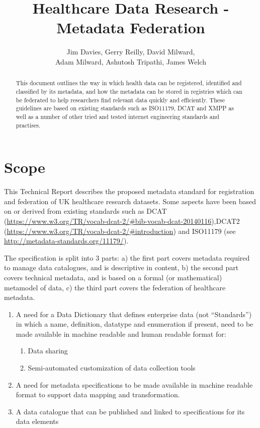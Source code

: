\documentclass{article}
\begin{document}
	\pagestyle{headings}  %
	\title{Healthcare Data Research - Metadata Federation}
	
	\author{Jim Davies, Gerry Reilly,  David Milward, \\ Adam Milward, Ashutosh Tripathi, James Welch}
	
	
	\maketitle
	
	\begin{abstract}
	This document outlines the way in which health data can be registered, identified and classified by its metadata, and how the metadata can be stored in registries which can be federated to help researchers find relevant data quickly and efficiently. These guidelines are based on existing standards such as ISO11179, DCAT and XMPP as well as a number of other tried and tested internet engineering standards and practises.	\end{abstract}
	
	\section{Scope}
	This Technical Report describes the proposed metadata standard for registration and federation of UK healthcare research datasets. Some aspects have been based on or derived from existing standards such as DCAT (\url{https://www.w3.org/TR/vocab-dcat-2/#bib-vocab-dcat-20140116}),DCAT2 (\url{https://www.w3.org/TR/vocab-dcat-2/#introduction}) and ISO11179 (see \url{http://metadata-standards.org/11179/}).
	
	The specification is split into 3 parts: a) the first part covers metadata required to manage data catalogues, and is descriptive in content, b) the second part covers technical metadata, and is based on a formal (or mathematical) metamodel of data, c) the third part covers the federation of healthcare metadata.
	
	
	
	\begin{enumerate}
		\item A need for a Data Dictionary that defines enterprise data (not “Standards”) in which a name,
definition, datatype and enumeration if present, need to be made available in machine readable
and human readable format for:
	\begin{enumerate}
		\item Data sharing
		\item Semi-automated customization of data collection tools
	\end{enumerate}
		\item A need for metadata specifications to be made available in machine readable format to support data mapping and transformation.
		\item A data catalogue that can be published and linked to specifications for its data elements	
	\end{enumerate}
\end{document}
